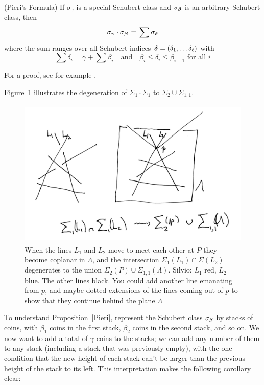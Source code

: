 \begin{fact}
\begin{proposition}\label{Pieri}(Pieri's Formula)
If $\sigma_\gamma$ is a special Schubert class and $\sigma_{{\boldsymbol{\beta}}}$ is an arbitrary Schubert class, then
$$
\sigma_\gamma \cdot \sigma_{\bbeta} \; = \; \sum \sigma_{\bdelta}
$$
where the sum ranges over all Schubert indices ${{\boldsymbol{\delta}}} = (\delta_1, \dots \delta_{\ell})$ with
$$
\sum \delta_i = \gamma + \sum \beta_i \quad \text{and} \quad \beta_i \leq \delta_i \leq \beta_{i-1} \text{ for all } i
$$
\end{proposition}
For a proof, see for example \cite[Section 4.2.4]{3264}.
\end{fact}
Figure~\ref{intersection product} illustrates the degeneration of $\Sigma_1\cdot \Sigma_1$ to $\Sigma_2 \cup \Sigma_{1,1}$.
\begin{figure}
\inprogress
\centerline {\includegraphics[height=2.8in]{"main/Fig12-3"}}
\caption{When the lines $L_1$ and $L_2$ move to meet each other at $P$ they become coplanar in $\Lambda$,
and the intersection $\Sigma_1(L_1) \cap \Sigma(L_2)$
degenerates to the union $\Sigma_2(P) \cup \Sigma_{1,1}(\Lambda)$.
{Silvio: $L_1$ red, $L_2$ blue. The other lines black. You could add another line emanating from $p$, and maybe dotted extensions
of the lines coming out of $p$ to show that they continue behind the plane $\Lambda$ }}
\label{intersection product}
\end{figure}

To understand Proposition~\ref{Pieri}, represent the Schubert class $\sigma_{{\boldsymbol{\beta}}}$ by stacks of coins, with $\beta_1$ coins in the first stack, $\beta_2$ coins in the second stack, and so on. We now want to add a total of $\gamma$ coins to the stacks; we can add any number of them to any stack (including a stack that was previously empty), with the one condition that the new height of each stack can't be larger than the previous height of the stack to its left. This interpretation makes the following corollary clear:

